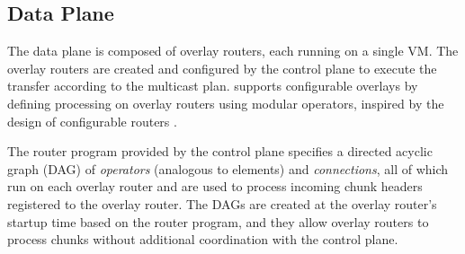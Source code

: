 \subsection{Data Plane}
The data plane is composed of overlay routers, each running on a single VM. 
The overlay routers are created and configured by the control plane to execute the transfer according to the multicast plan. 
\sys{} supports configurable overlays by defining processing on overlay routers using modular operators, inspired by the design of configurable routers \cite{kohler2000click}.

The router program provided by the control plane specifies a directed acyclic graph (DAG) of \textit{operators} (analogous to elements) and \textit{connections}, all of which run on each overlay router and are used to process incoming chunk headers registered to the overlay router. 
The DAGs are created at the overlay router's startup time based on the router program, and they allow overlay routers to process chunks without additional coordination with the control plane.

%

